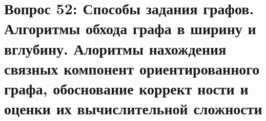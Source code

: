 
\section{Вопрос 52: Способы задания графов. Алгоритмы обхода графа в ширину и вглубину. Алоритмы нахождения связных компонент ориентированного графа, обоснование коррект ности и оценки их вычислительной сложности}

                                                                                                                                                                                                                                                                                                                                                                                                                                                                                                                                                                                                                                                                                                                                                                                                                                                                                                                                                                                                                                                                                                                                                                                                                                                                                                                                                                                                                                                                                                                                                                                                                                                                                                                                                                                                                                                                                                                                                                                                                                                                                                                                                                                                                                                                                                                                                                                                                                                                                                                                                                                                                                                                                                                                                                                                                                                                                                                                                                                                            